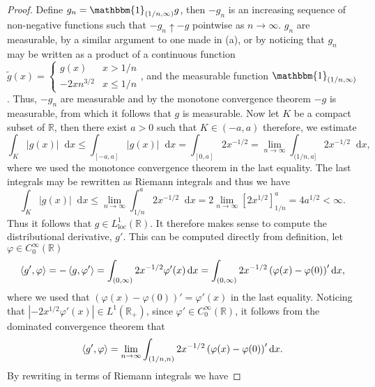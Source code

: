 \documentclass[a4paper,11pt]{article}
\newcommand{\abs}[1]{\left\lvert #1 \right\rvert}
\newcommand*\diff{\mathop{}\!\mathrm{d}}
\newcommand{\R}{\mathbb{R}}
\newcommand{\loc}{\text{loc}}
\numberwithin{equation}{section}
\begin{document}
\begin{proof}
Define $ g_n=\mathbbm{1}_{(1/n,\infty)}g $, then $ -g_n $ is an increasing sequence of non-negative functions such that $ -g_n\uparrow-g $ pointwise as $ n\to\infty $. $ g_n $ are measurable, by a similar argument to one made in (a), or by noticing that $ g_n $ may be written as a product of a continuous function $ \tilde{g}(x)=\begin{cases}
g(x)&x>1/n\\
-2xn^{3/2}&x\leq1/n
\end{cases} $, and the measurable function $ \mathbbm{1}_{(1/n,\infty)} $. Thus, $ -g_n $ are measurable and by the monotone convergence theorem $ -g $ is measurable, from which it follows that $ g $ is measurable. Now let $ K $ be a compact subset of $ \R $, then there exist $ a>0 $ such that $ K\in(-a,a) $ therefore, we estimate \begin{equation}
\int_K\abs{g(x)}\diff x\leq\int_{[-a,a]}\abs{g(x)}\diff x=\int_{[0,a]}2x^{-1/2}=\lim\limits_{n\to\infty}\int_{(1/n,a]} 2x^{-1/2}\diff x,
\end{equation}
where we used the monotonce convergence theorem in the last equality. The last integrals may be rewritten as Riemann integrals and thus we have \begin{equation}
\int_K\abs{g(x)}\diff x\leq\lim\limits_{n\to\infty}\int_{1/n}^{a}2x^{-1/2}\diff x=2\lim\limits_{n\to\infty}\left[2x^{1/2}\right]_{1/n}^{a}=4a^{1/2}<\infty.
\end{equation}
Thus it follows that $ g\in L^1_\loc(\R) $. It therefore makes sense to compute the distributional derivative, $ g' $. This can be computed directly from definition, let $ \varphi\in C^\infty_0(\R) $ \begin{equation}
\braket{g',\varphi}=-\braket{g,\varphi'}=\int_{(0,\infty)} 2x^{-1/2}\varphi'(x)\diff x=\int_{(0,\infty)} 2x^{-1/2}\left(\varphi(x)-\varphi(0)\right)'\diff x,
\end{equation}
where we used that $ \left(\varphi(x)-\varphi(0)\right)'=\varphi'(x) $ in the last equality. Noticing that $ \abs{-2x^{1/2}\varphi'(x)}\in L^1(\R_+) $, since $ \varphi'\in C^\infty_0(\R) $, it follows from the dominated convergence theorem that \begin{equation}
\begin{aligned}
\braket{g',\varphi}=\lim\limits_{n\to\infty}\int_{(1/n,n)} 2x^{-1/2}\left(\varphi(x)-\varphi(0)\right)'\diff x.
\end{aligned}
\end{equation}
By rewriting in terms of Riemann integrals we have

\end{proof}
\end{document}
